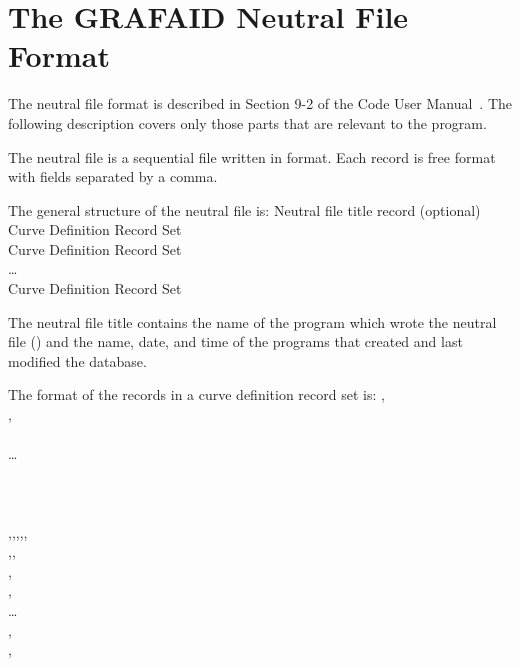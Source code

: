 \chapter{The GRAFAID Neutral File Format} \label{appx:grafaid}

The  neutral file format is described in Section 9-2 of
the  Code User Manual~\cite{bib:grafaid}. The
following description covers only those parts that are relevant to the
\caps{\PROGRAM} program.

The neutral file is a sequential file written in  format.
Each record is free format with fields separated by a comma.

The general structure of the  neutral file is:
\cenlinesbegin
Neutral file title record (optional) \\
 Curve Definition Record Set \\
 Curve Definition Record Set \\
\ldots\ \\
 Curve Definition Record Set \\
\cenlinesend

The neutral file title contains the name of the program which wrote the
neutral file (\caps{\PROGRAM}) and the name, date, and time of the
programs that created and last modified the database.

The format of the records in a curve definition record set is:
\cenlinesbegin
{}, \\
, \\
 \\
\ldots\ \\
 \\
 \\
 \\
,,,,,
\\
,, \\
, \\
, \\
\ldots\ \\
, \\
,
\cenlinesend

\newpage
\newlength{\graftag}
\newlength{\grafdesc}
\setlength{\grafdesc}{\textwidth}
\addtolength{\grafdesc}{-\graftag}
\addtolength{\grafdesc}{-\tabbingsep}

